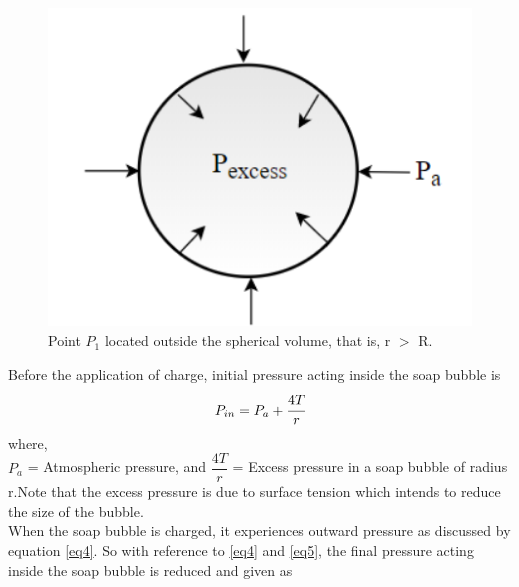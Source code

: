 \begin{figure}
     \centering 
     \includegraphics[scale = 0.5]{figures/elecmag/fig2.png}
     \caption{Point $P_1$ located outside the spherical volume, that is, r $>$ R. }
     \label{fig5}
 \end{figure}
Before the application of charge, initial pressure acting inside the soap bubble is 
\begin{equation}\label{eq5}
    P_{in} = P_a + \cfrac{4T}{r}
\end{equation}
where,\\
$P_a$ = Atmospheric pressure, and
$\dfrac{4T}{r}$ = Excess pressure in a soap bubble of radius r.Note that the excess pressure is due to surface tension which intends to reduce the size of the bubble.\\
When the soap bubble is charged, it experiences outward pressure as discussed by equation \ref{eq4}. So with reference to \ref{eq4} and \ref{eq5}, the final pressure acting inside the soap bubble is reduced and given as 

